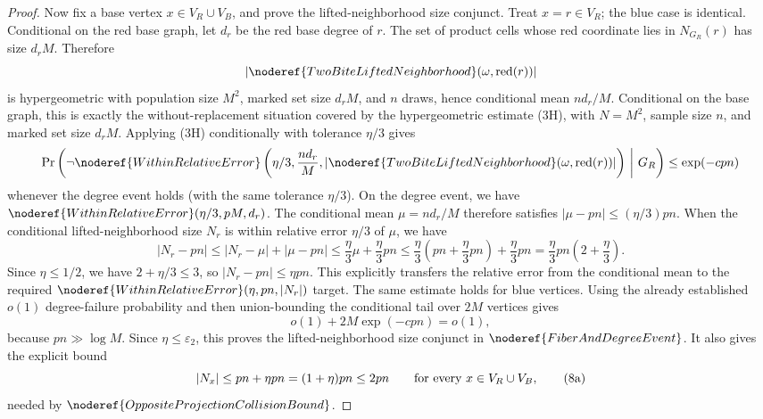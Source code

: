 \begin{proof}
Now fix a base vertex \(x\in V_R\cup V_B\), and prove the lifted-neighborhood
size conjunct.  Treat \(x=r\in V_R\); the blue case is identical.  Conditional
on the red base graph, let \(d_r\) be the red base degree of \(r\).  The set
of product cells whose red coordinate lies in \(N_{G_R}(r)\) has size
\(d_rM\).  Therefore
\[
|\noderef{TwoBiteLiftedNeighborhood}(\omega,\operatorname{red}(r))|
\]
is hypergeometric with population size \(M^2\), marked set size \(d_rM\), and
\(n\) draws, hence conditional mean \(nd_r/M\).  Conditional on the base
graph, this is exactly the without-replacement situation covered by the
hypergeometric estimate (3H), with \(N=M^2\), sample size \(n\), and marked
set size \(d_rM\).  Applying (3H) conditionally with tolerance \(\eta/3\)
gives
\[
\Pr\left(
\neg\noderef{WithinRelativeError}
\left(\eta/3,\frac{nd_r}{M},
|\noderef{TwoBiteLiftedNeighborhood}(\omega,\operatorname{red}(r))|
\right)
\ \middle|\ G_R\right)
\le \exp(-c pn)
\]
whenever the degree event holds (with the same tolerance \(\eta/3\)).  On the degree event, we have \(\noderef{WithinRelativeError}(\eta/3, pM, d_r)\). The conditional mean \(\mu = nd_r/M\) therefore satisfies \(|\mu - pn| \le (\eta/3) pn\). When the conditional lifted-neighborhood size \(N_r\) is within relative error \(\eta/3\) of \(\mu\), we have
\[
|N_r - pn| \le |N_r - \mu| + |\mu - pn| \le \frac{\eta}{3} \mu + \frac{\eta}{3} pn \le \frac{\eta}{3} \left(pn + \frac{\eta}{3}pn\right) + \frac{\eta}{3} pn = \frac{\eta}{3} pn \left(2 + \frac{\eta}{3}\right).
\]
Since \(\eta \le 1/2\), we have \(2 + \eta/3 \le 3\), so \(|N_r - pn| \le \eta pn\). This explicitly transfers the relative error from the conditional mean to the required \(\noderef{WithinRelativeError}(\eta, pn, |N_r|)\) target. The same estimate holds for blue vertices.
Using the already established \(o(1)\) degree-failure probability and then
union-bounding the conditional tail over \(2M\) vertices gives
\[
o(1)+2M\exp(-c pn)=o(1),
\tag{8}
\]
because \(pn\gg\log M\).  Since \(\eta\le\varepsilon_2\), this proves the
lifted-neighborhood size conjunct in \(\noderef{FiberAndDegreeEvent}\). It also gives the explicit bound
\[
|N_x| \le pn + \eta pn = (1+\eta)pn \le 2pn
\qquad\hbox{for every }x\in V_R\cup V_B,
\tag{8a}
\]
needed by \(\noderef{OppositeProjectionCollisionBound}\).


\end{proof}
